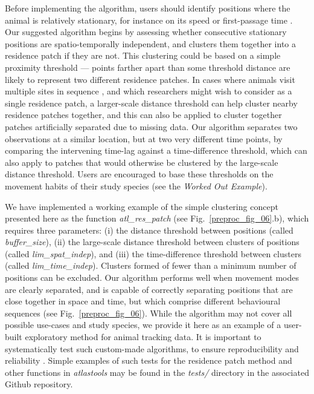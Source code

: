     Before implementing the algorithm, users should identify positions where the animal is relatively stationary, for instance on its speed or first-passage time \citep{bracis2018,barraquand2008}.
    Our suggested algorithm begins by assessing whether consecutive stationary positions are spatio-temporally independent, and clusters them together into a residence patch if they are not.
    This clustering could be based on a simple proximity threshold --- points farther apart than some threshold distance are likely to represent two different residence patches.
    In cases where animals visit multiple sites in sequence \citep[such as traplining:][]{thomson1997}, and which researchers might wish to consider as a single residence patch, a larger-scale distance threshold can help cluster nearby residence patches together, and this can also be applied to cluster together patches artificially separated due to missing data.
    Our algorithm separates two observations at a similar location, but at two very different time points, by comparing the intervening time-lag against a time-difference threshold, which can also apply to patches that would otherwise be clustered by the large-scale distance threshold.
    Users are encouraged to base these thresholds on the movement habits of their study species (see the \textit{Worked Out Example}).

    We have implemented a working example of the simple clustering concept presented here as the function \textit{atl\_res\_patch} (see Fig.~\ref{preproc_fig_06}.b), which requires three parameters: (i) the distance threshold between positions (called \textit{buffer\_size}), (ii) the large-scale distance threshold between clusters of positions (called \textit{lim\_spat\_indep}), and (iii) the time-difference threshold between clusters (called \textit{lim\_time\_indep}).
    Clusters formed of fewer than a minimum number of positions can be excluded.
    Our algorithm performs well when movement modes are clearly separated, and is capable of correctly separating positions that are close together in space and time, but which comprise different behavioural sequences (see Fig.~\ref{preproc_fig_06}).
    While the algorithm may not cover all possible use-cases and study species, we provide it here as an example of a user-built exploratory method for animal tracking data.
    It is important to systematically test such custom-made algorithms, to ensure reproducibility and reliability \citep{wickham2015, marwick2018}.
    Simple examples of such tests for the residence patch method and other functions in \textit{atlastools} may be found in the \textit{tests/} directory in the associated Github repository.

